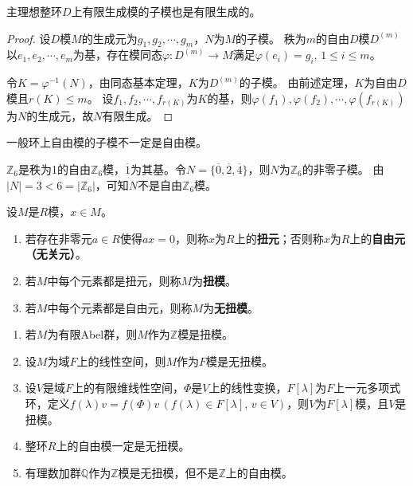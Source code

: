 \documentclass[../../main.tex]{subfiles}%
\begin{document}
\begin{corollary}
主理想整环$D$上有限生成模的子模也是有限生成的。
\end{corollary}
\begin{proof}
设$D$模$M$的生成元为$g_1,g_2,\cdots,g_m$，$N$为$M$的子模。
秩为$m$的自由$D$模$D^{(m)}$以$e_1,e_2,\cdots,e_m$为基，存在模同态$\varphi:D^{(m)}\to M$满足$\varphi(e_i)=g_i,\,1\leqslant i\leqslant m$。

令$K=\varphi^{-1}(N)$，由同态基本定理，$K$为$D^{(m)}$的子模。
由前述定理，$K$为自由$D$模且$r(K)\leqslant m$。
设$f_1,f_2,\cdots,f_{r(K)}$为$K$的基，则$\varphi(f_1),\varphi(f_2),\cdots,\varphi(f_{r(K)})$为$N$的生成元，故$N$有限生成。
\end{proof}

\begin{remark}
一般环上自由模的子模不一定是自由模。
\end{remark}

\begin{example}
$\mathbb{Z}_6$是秩为1的自由$\mathbb{Z}_6$模，$\overline{1}$为其基。令$N=\{\overline{0},\overline{2},\overline{4}\}$，则$N$为$\mathbb{Z}_6$的非零子模。
由$|N|=3<6=|\mathbb{Z}_6|$，可知$N$不是自由$\mathbb{Z}_6$模。
\end{example}

\begin{definition}
设$M$是$R$模，$x\in M$。
\begin{enumerate}[(1)]
\item 若存在非零元$a\in R$使得$ax=0$，则称$x$为$R$上的\textbf{扭元}；否则称$x$为$R$上的\textbf{自由元（无关元）}。
\item 若$M$中每个元素都是扭元，则称$M$为\textbf{扭模}。
\item 若$M$中每个元素都是自由元，则称$M$为\textbf{无扭模}。
\end{enumerate}
\end{definition}

\begin{examples}
\begin{enumerate}[(1)]
\item 若$M$为有限Abel群，则$M$作为$\mathbb{Z}$模是扭模。
\item 设$M$为域$F$上的线性空间，则$M$作为$F$模是无扭模。
\item 设$V$是域$F$上的有限维线性空间，$\Phi$是$V$上的线性变换，$F[\lambda]$为$F$上一元多项式环，定义$f(\lambda)v=f(\Phi)v\,(f(\lambda)\in F[\lambda],\,v\in V)$，则$V$为$F[\lambda]$模，且$V$是扭模。
\item 整环$R$上的自由模一定是无扭模。
\item 有理数加群$\mathbb{Q}$作为$\mathbb{Z}$模是无扭模，但不是$\mathbb{Z}$上的自由模。
\end{enumerate}
\end{examples}
\end{document}

